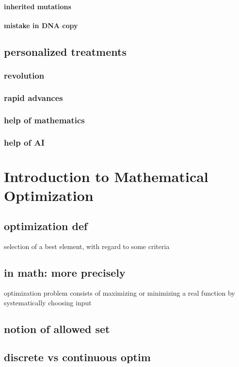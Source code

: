 \paragraph{inherited mutations}
\paragraph{mistake in DNA copy} 

\subsection{personalized treatments}
\subsubsection{revolution}
\subsubsection{rapid advances}
\subsubsection{help of mathematics}
\subsubsection{help of AI}

\section{Introduction to Mathematical Optimization}

\subsection{optimization def}
selection of a best element, with regard to some criteria

\subsection{in math: more precisely}
optimization problem consists of maximizing or minimizing a real function by systematically choosing input

\subsection{notion of allowed set}

\subsection{discrete vs continuous optim}

